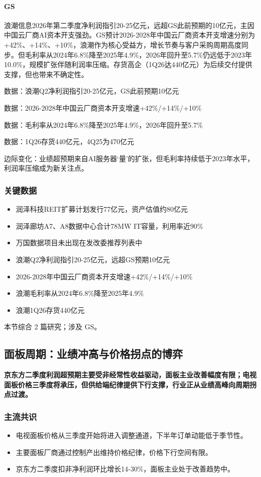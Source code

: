 \documentclass[11pt]{ctexart}
\begin{document}
\paragraph{GS} 浪潮信息2026年第二季度净利润指引20-25亿元，远超GS此前预期的10亿元，主因中国云厂商AI资本开支强劲。GS预计2026-2028年中国云厂商资本开支增速分别为+42\%、+14\%、+10\%，浪潮作为核心受益方，增长节奏与客户采购周期高度同步。但毛利率从2024年6.8\%降至2025年4.9\%，2026年回升至5.7\%仍远低于2023年10.0\%，规模扩张伴随利润率压缩。存货高企（1Q26达440亿元）为后续交付提供支撑，但也带来不确定性。
{\small\color{refgray}数据：浪潮Q2净利润指引20-25亿元，GS此前预期10亿元\par}
{\small\color{refgray}数据：2026-2028年中国云厂商资本开支增速+42\%/+14\%/+10\%\par}
{\small\color{refgray}数据：毛利率从2024年6.8\%降至2025年4.9\%，2026年回升至5.7\%\par}
{\small\color{refgray}数据：1Q26存货440亿元，4Q25为470亿元\par}
{\small\color{refgray}边际变化：业绩超预期来自AI服务器‘量’的扩张，但毛利率持续低于2023年水平，利润率压缩成为新关注点。\par}
\subsubsection*{关键数据}
\begin{itemize}
  \item 润泽科技REIT扩募计划发行77亿元，资产估值约80亿元
  \item 润泽廊坊A7、A8数据中心合计78MW IT容量，利用率近90\%
  \item 万国数据项目未出现在发改委推荐列表中
  \item 浪潮Q2净利润指引20-25亿元，远超GS预期10亿元
  \item 2026-2028年中国云厂商资本开支增速+42\%/+14\%/+10\%
  \item 浪潮毛利率从2024年6.8\%降至2025年4.9\%
  \item 浪潮1Q26存货440亿元
\end{itemize}
{\small\color{refgray}本节综合 2 篇研究；涉及 GS。}
\newpage
\subsection{面板周期：业绩冲高与价格拐点的博弈}
\textbf{京东方二季度利润超预期主要受非经常性收益驱动，面板主业改善幅度有限；电视面板价格三季度将承压，但供给端纪律提供下行支撑，行业正从业绩高峰向周期拐点过渡。}
\subsubsection*{主流共识}
\begin{itemize}
  \item 电视面板价格从三季度开始将进入调整通道，下半年订单动能低于季节性。
  \item 主要面板厂商通过控制产出维持价格纪律，价格下行空间有限。
  \item 京东方二季度扣非净利润环比增长14-30\%，面板主业处于改善趋势中。
\end{itemize}
\end{document}
